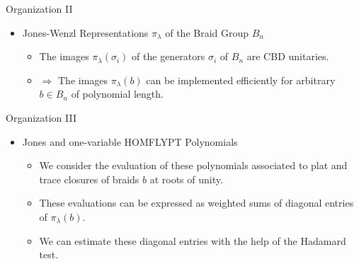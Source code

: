 \documentclass[slideColor]{prosper}
\renewcommand{\>}{\rangle}
\newcommand{\<}{\langle}
\begin{document}

\begin{slide}{Organization II}
\begin{itemize}

\item Jones-Wenzl Representations $\pi_\lambda$ of the Braid Group $B_n$

\medskip
\begin{itemize}
\item The images $\pi_\lambda(\sigma_i)$ of the generators $\sigma_i$ of $B_n$ are CBD unitaries.

\bigskip
\item $\Rightarrow$ The images $\pi_\lambda(b)$ can be implemented efficiently for arbitrary $b\in B_n$ of polynomial length.

\end{itemize}
\end{itemize}
\end{slide}


\begin{slide}{Organization III}
\begin{itemize}
\item Jones and one-variable HOMFLYPT Polynomials

\medskip
\begin{itemize}
\item We consider the evaluation of these polynomials associated to plat and trace closures of braids $b$ at roots of unity.

\bigskip
\item These evaluations can be expressed as weighted sums of diagonal entries of $\pi_\lambda(b)$.

\bigskip
\item We can estimate these diagonal entries with the help of the Hadamard test.
\end{itemize}
\end{itemize}
\end{slide}

\end{document}
